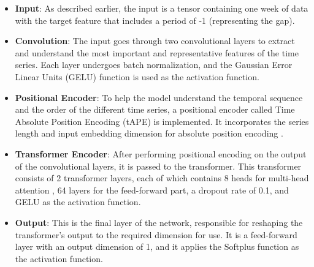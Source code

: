 %

\begin{itemize}
	\item \textbf{Input}: As described earlier,
	      the input is a tensor containing one week of data with the
	      target feature that includes a period of -1 (representing the gap).
	\item \textbf{Convolution}: The input goes through two convolutional layers to extract and understand the most important and representative features of the time series. Each layer undergoes batch normalization, and the Gaussian Error Linear Units (GELU) \cite{gelu} function is used as the activation function.
	\item \textbf{Positional Encoder}: To help the model understand the temporal sequence and the order of the different time series, a positional encoder called Time Absolute Position Encoding (tAPE)\cite{tape} is implemented. It incorporates the series length and input embedding dimension for absolute position encoding \cite{tape}.
	\item \textbf{Transformer Encoder}: After performing positional encoding on the output of the convolutional layers, it is passed to the transformer. This transformer \cite{attention} consists of 2 transformer layers, each of which contains 8 heads for multi-head attention \cite{attention}, 64 layers for the feed-forward part, a dropout rate of 0.1, and GELU as the activation function.
	\item \textbf{Output}: This is the final layer of the network, responsible for reshaping the transformer's output to the required dimension for use. It is a feed-forward layer with an output dimension of 1, and it applies the Softplus \cite{functions} function as the activation function.
\end{itemize}

